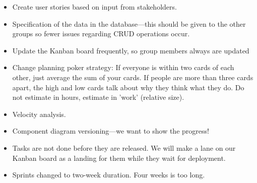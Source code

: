 \begin{itemize}
    \item Create user stories based on input from stakeholders.
    \item Specification of the data in the database---this should be given to the other groups so fewer issues regarding CRUD operations occur.
    \item Update the Kanban board frequently, so group members always are updated
    \item Change planning poker strategy:
    \subitem If everyone is within two cards of each other, just average the sum of your cards.
    \subitem If people are more than three cards apart, the high and low cards talk about why they think what they do.
    \subitem Do not estimate in hours, estimate in 'work' (relative size).
    \item Velocity analysis.
    \item Component diagram versioning---we want to show the progress!
    \item Tasks are not done before they are released. We will make a lane on our Kanban board as a landing for them while they wait for deployment.
    \item Sprints changed to two-week duration. Four weeks is too long.
\end{itemize}
